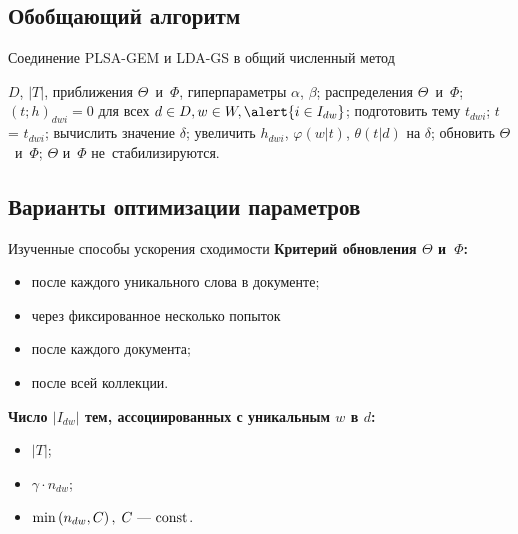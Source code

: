 \documentclass[unicode,lefteqn,c,hyperref={pdfpagelabels=false}]{beamer}
\begin{document}
\subsection{Обобщающий алгоритм}
\begin{frame}{Соединение PLSA-GEM и LDA-GS в общий численный метод}
\begin{algorithmic}[1]
    \REQUIRE
		$D$, $|T|$, приближения $\Theta$~и~$\Phi$, гиперпараметры $\alpha$, $\beta$;
    \ENSURE
        распределения $\Theta$~и~$\Phi$;
	\STATE $(t; h)_{dwi} = 0 $ для всех $d\in D, w \in W, \alert{i \in I_{dw}}$;
    \REPEAT
			\STATE подготовить тему $t_{dwi}$; \; $t$ = $t_{dwi}$;			
			\STATE вычислить значение $\delta$;
			\STATE увеличить $h_{dwi}$, $\varphi(w|t)$, $\theta(t|d)$ на $\delta$;		
				\STATE обновить $\Theta$~и~$\Phi$;
			\ENDIF
        \ENDFOR
    \UNTIL $\Theta$ и~$\Phi$ не~стабилизируются.
\end{algorithmic} 
\end{frame}

\subsection{Варианты оптимизации параметров}
\begin{frame}{Изученные способы ускорения сходимости}
\textbf{Критерий обновления $\Theta$ и~$\Phi$:}
\begin{itemize}
		\item после каждого уникального слова в документе;
		\item через фиксированное несколько попыток 
		\item после каждого документа;
		\item после всей коллекции.
\end{itemize}
\textbf{Число $|I_{dw}|$ тем, ассоциированных с уникальным $w$ в $d$:}
\begin{itemize}
		\item $|T|$;
		\item $\gamma \cdot n_{dw}$;
		\item $\min\left(n_{dw}, C\right), \; C\text{ --- const}$.
\end{itemize}
\end{frame}
\end{document}
